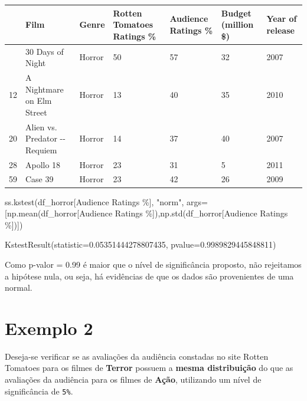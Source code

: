 \documentclass[
  letterpaper,
  DIV=11,
  numbers=noendperiod]{scrreprt}
\newenvironment{Shaded}{\begin{snugshade}}{\end{snugshade}}
\newcommand{\NormalTok}[1]{\textcolor[rgb]{0.00,0.23,0.31}{#1}}
\newcommand{\OperatorTok}[1]{\textcolor[rgb]{0.37,0.37,0.37}{#1}}
\newcommand{\StringTok}[1]{\textcolor[rgb]{0.13,0.47,0.30}{#1}}
\begin{document}
\begin{longtable}[]{@{}lllllll@{}}
\toprule\noalign{}
& Film & Genre & Rotten Tomatoes Ratings \% & Audience Ratings \% &
Budget (million \$) & Year of release \\
\midrule\noalign{}
\endhead
\bottomrule\noalign{}
\endlastfoot
7 & 30 Days of Night & Horror & 50 & 57 & 32 & 2007 \\
12 & A Nightmare on Elm Street & Horror & 13 & 40 & 35 & 2010 \\
20 & Alien vs. Predator -\/- Requiem & Horror & 14 & 37 & 40 & 2007 \\
28 & Apollo 18 & Horror & 23 & 31 & 5 & 2011 \\
59 & Case 39 & Horror & 23 & 42 & 26 & 2009 \\
\end{longtable}

\begin{Shaded}
\begin{Highlighting}[]
\NormalTok{ss.kstest(df\_horror[}\StringTok{\textquotesingle{}Audience Ratings \%\textquotesingle{}}\NormalTok{], }\StringTok{"norm"}\NormalTok{, args}\OperatorTok{=}\NormalTok{[np.mean(df\_horror[}\StringTok{\textquotesingle{}Audience Ratings \%\textquotesingle{}}\NormalTok{]),np.std(df\_horror[}\StringTok{\textquotesingle{}Audience Ratings \%\textquotesingle{}}\NormalTok{])])}
\end{Highlighting}
\end{Shaded}

\begin{tcolorbox}[enhanced jigsaw, breakable, leftrule=.75mm, left=2mm, opacityback=0, bottomrule=.15mm, toprule=.15mm, rightrule=.15mm, arc=.35mm, colback=white]

KstestResult(statistic=0.05351444278807435, pvalue=0.9989829445848811)

\end{tcolorbox}

Como p-valor = 0.99 é maior que o nível de significância proposto, não
rejeitamos a hipótese nula, ou seja, há evidências de que os dados são
provenientes de uma normal.

\hypertarget{exemplo-2-6}{%
\section{Exemplo 2}\label{exemplo-2-6}}

Deseja-se verificar se as avaliações da audiência constadas no site
Rotten Tomatoes para os filmes de \textbf{Terror} possuem a
\textbf{mesma distribuição} do que as avaliações da audiência para os
filmes de \textbf{Ação}, utilizando um nível de significância de
\texttt{5\%}.
\end{document}
